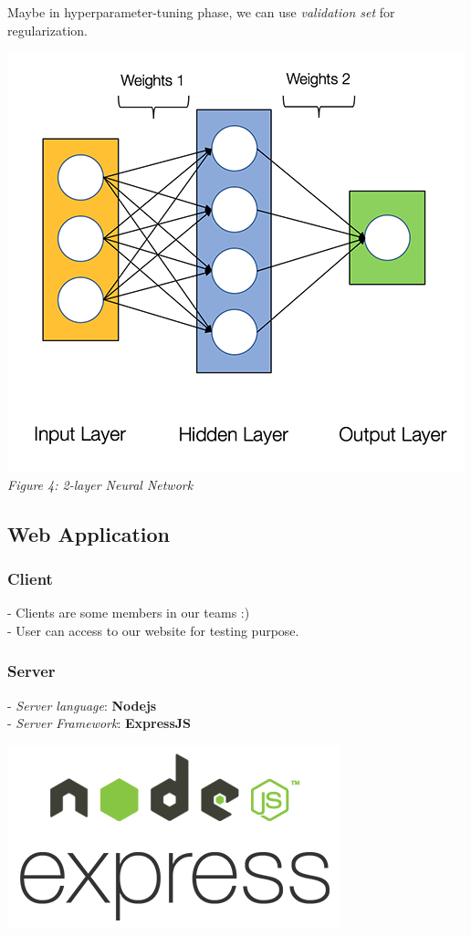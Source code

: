Maybe in hyperparameter-tuning phase, we can use \textit{validation set} for regularization.
\begin{center}
\includegraphics[scale=0.40]{our_network} \\
\textit{Figure 4: 2-layer Neural Network}
\end{center}

\subsection{Web Application}
\subsubsection{Client}
- Clients are some members in our teams :)\\
- User can access to our website for testing purpose.
\subsubsection{Server}
- \textit{Server language}: \textbf{Nodejs} \\
- \textit{Server Framework}: \textbf{ExpressJS} \\

\begin{center}
\includegraphics[scale=0.25]{nodejs-express}
\end{center}

